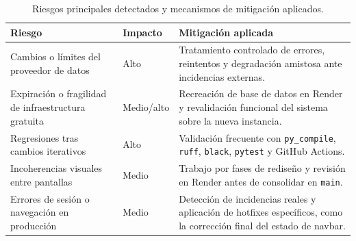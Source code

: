 \begin{table}[htbp]
\centering
\begin{tabular}{|p{}|p{}|p{}|}
\hline
\textbf{Riesgo} & \textbf{Impacto} & \textbf{Mitigación aplicada} \\ \hline
Cambios o límites del proveedor de datos & Alto & Tratamiento controlado de errores, reintentos y degradación amistosa ante incidencias externas. \\ \hline
Expiración o fragilidad de infraestructura gratuita & Medio/alto & Recreación de base de datos en Render y revalidación funcional del sistema sobre la nueva instancia. \\ \hline
Regresiones tras cambios iterativos & Alto & Validación frecuente con \texttt{py\_compile}, \texttt{ruff}, \texttt{black}, \texttt{pytest} y GitHub Actions. \\ \hline
Incoherencias visuales entre pantallas & Medio & Trabajo por fases de rediseño y revisión en Render antes de consolidar en \texttt{main}. \\ \hline
Errores de sesión o navegación en producción & Medio & Detección de incidencias reales y aplicación de hotfixes específicos, como la corrección final del estado de navbar. \\ \hline
\end{tabular}
\caption{Riesgos principales detectados y mecanismos de mitigación aplicados.}
\label{tab:riesgos_actualizados}
\end{table}
